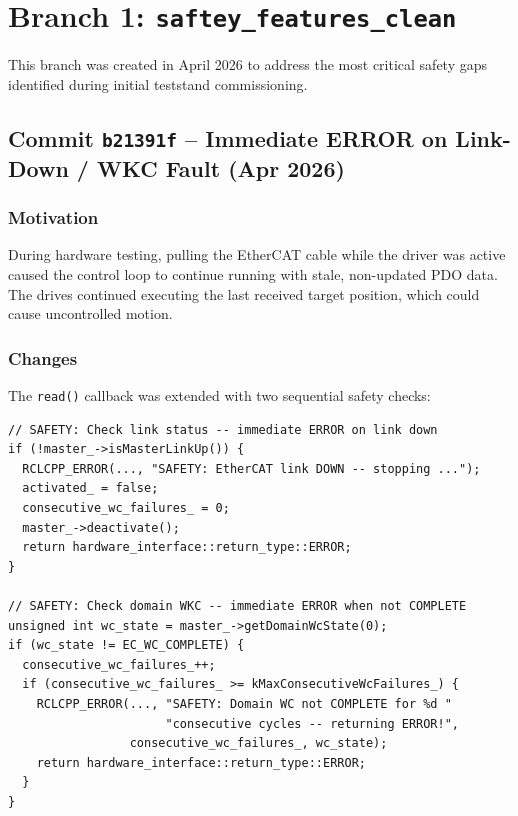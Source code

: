 \documentclass[11pt,a4paper]{article}
\begin{document}
\section{Branch 1: \texttt{saftey\_features\_clean}}
\label{sec:safety-branch}

This branch was created in April 2026 to address the most critical safety gaps
identified during initial teststand commissioning.

\subsection{Commit \texttt{b21391f} -- Immediate ERROR on Link-Down / WKC Fault (Apr 2026)}

\subsubsection{Motivation}

During hardware testing, pulling the EtherCAT cable while the driver was
active caused the control loop to continue running with stale, non-updated
PDO data.  The drives continued executing the last received target position,
which could cause uncontrolled motion.

\subsubsection{Changes}

The \texttt{read()} callback was extended with two sequential safety checks:

\begin{lstlisting}[caption={Link-down detection in \texttt{read()}}]
// SAFETY: Check link status -- immediate ERROR on link down
if (!master_->isMasterLinkUp()) {
  RCLCPP_ERROR(..., "SAFETY: EtherCAT link DOWN -- stopping ...");
  activated_ = false;
  consecutive_wc_failures_ = 0;
  master_->deactivate();
  return hardware_interface::return_type::ERROR;
}

// SAFETY: Check domain WKC -- immediate ERROR when not COMPLETE
unsigned int wc_state = master_->getDomainWcState(0);
if (wc_state != EC_WC_COMPLETE) {
  consecutive_wc_failures_++;
  if (consecutive_wc_failures_ >= kMaxConsecutiveWcFailures_) {
    RCLCPP_ERROR(..., "SAFETY: Domain WC not COMPLETE for %d "
                      "consecutive cycles -- returning ERROR!",
                 consecutive_wc_failures_, wc_state);
    return hardware_interface::return_type::ERROR;
  }
}
\end{lstlisting}
\end{document}
